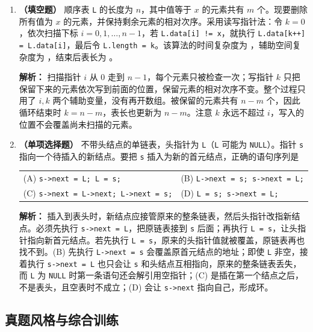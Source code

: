\begin{enumerate}
\item \textbf{（填空题）} 顺序表 \texttt{L} 的长度为 $n$，其中值等于 $x$ 的元素共有 $m$ 个。现要删除所有值为 $x$ 的元素，并保持剩余元素的相对次序。采用读写指针法：令 $k=0$，依次扫描下标 $i=0,1,\ldots,n-1$，若 \texttt{L.data[i] != x}，就执行 \texttt{L.data[k++] = L.data[i]}，最后令 \texttt{L.length = k}。该算法的时间复杂度为 \underline{\qquad}，辅助空间复杂度为 \underline{\qquad}，结束后表长为 \underline{\qquad}。

\ifshowsolutions\par\noindent\textbf{解析：} 扫描指针 $i$ 从 $0$ 走到 $n-1$，每个元素只被检查一次；写指针 $k$ 只把保留下来的元素依次写到前面的位置，保留元素的相对次序不变。整个过程只用了 $i,k$ 两个辅助变量，没有再开数组。被保留的元素共有 $n-m$ 个，因此循环结束时 $k=n-m$，表长也更新为 $n-m$。注意 $k$ 永远不超过 $i$，写入的位置不会覆盖尚未扫描的元素。\else \answerarea \fi

\item \textbf{（单项选择题）} 不带头结点的单链表，头指针为 \texttt{L}（\texttt{L} 可能为 \texttt{NULL}）。指针 \texttt{s} 指向一个待插入的新结点。要把 \texttt{s} 插入为新的首元结点，正确的语句序列是

\begin{center}
\begin{tabular}{ll}
(A) \texttt{s->next = L; L = s;} & (B) \texttt{L->next = s; s->next = L;} \\[6pt]
(C) \texttt{s->next = L->next; L->next = s;} & (D) \texttt{L = s; s->next = L;}
\end{tabular}
\end{center}

\ifshowsolutions\par\noindent\textbf{解析：} 插入到表头时，新结点应接管原来的整条链表，然后头指针改指新结点。必须先执行 \texttt{s->next = L}，把原链表接到 \texttt{s} 后面；再执行 \texttt{L = s}，让头指针指向新首元结点。若先执行 \texttt{L = s}，原来的头指针值就被覆盖，原链表再也找不到。(B) 先执行 \texttt{L->next = s} 会覆盖原首元结点的地址；即使 \texttt{L} 非空，接着执行 \texttt{s->next = L} 也只会让 \texttt{s} 和头结点互相指向，原来的整条链表丢失，而 \texttt{L} 为 \texttt{NULL} 时第一条语句还会解引用空指针；(C) 是插在第一个结点之后，不是表头，且空表时不成立；(D) 会让 \texttt{s->next} 指向自己，形成环。\else \answerarea \fi

\end{enumerate}

\subsection{真题风格与综合训练}

